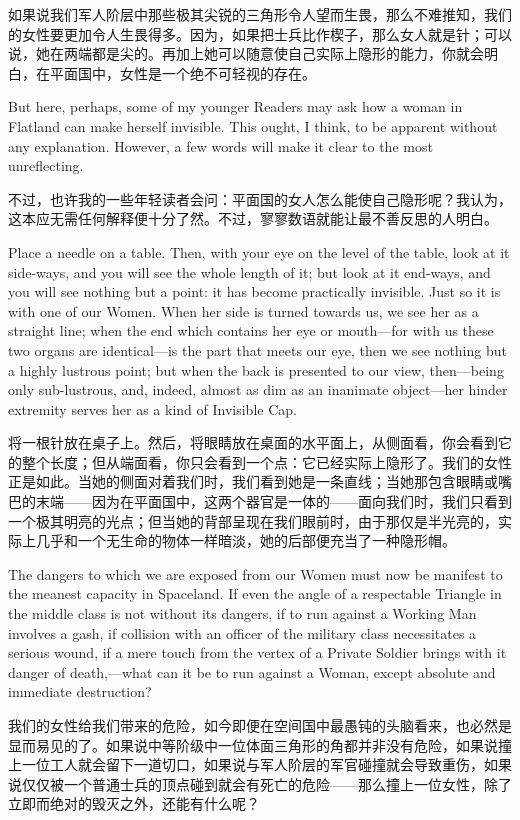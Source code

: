 \documentclass[12pt,UTF8]{ctexbook}
\begin{document}
如果说我们军人阶层中那些极其尖锐的三角形令人望而生畏，那么不难推知，我们的女性要更加令人生畏得多。因为，如果把士兵比作楔子，那么女人就是针；可以说，她在两端都是尖的。再加上她可以随意使自己实际上隐形的能力，你就会明白，在平面国中，女性是一个绝不可轻视的存在。

But here, perhaps, some of my younger Readers may ask how a woman in Flatland can make herself invisible. This ought, I think, to be apparent without any explanation. However, a few words will make it clear to the most unreflecting.

不过，也许我的一些年轻读者会问：平面国的女人怎么能使自己隐形呢？我认为，这本应无需任何解释便十分了然。不过，寥寥数语就能让最不善反思的人明白。

Place a needle on a table. Then, with your eye on the level of the table, look at it side-ways, and you will see the whole length of it; but look at it end-ways, and you will see nothing but a point: it has become practically invisible. Just so it is with one of our Women. When her side is turned towards us, we see her as a straight line; when the end which contains her eye or mouth---for with us these two organs are identical---is the part that meets our eye, then we see nothing but a highly lustrous point; but when the back is presented to our view, then---being only sub-lustrous, and, indeed, almost as dim as an inanimate object---her hinder extremity serves her as a kind of Invisible Cap.

将一根针放在桌子上。然后，将眼睛放在桌面的水平面上，从侧面看，你会看到它的整个长度；但从端面看，你只会看到一个点：它已经实际上隐形了。我们的女性正是如此。当她的侧面对着我们时，我们看到她是一条直线；当她那包含眼睛或嘴巴的末端——因为在平面国中，这两个器官是一体的——面向我们时，我们只看到一个极其明亮的光点；但当她的背部呈现在我们眼前时，由于那仅是半光亮的，实际上几乎和一个无生命的物体一样暗淡，她的后部便充当了一种隐形帽。

The dangers to which we are exposed from our Women must now be manifest to the meanest capacity in Spaceland. If even the angle of a respectable Triangle in the middle class is not without its dangers, if to run against a Working Man involves a gash, if collision with an officer of the military class necessitates a serious wound, if a mere touch from the vertex of a Private Soldier brings with it danger of death,---what can it be to run against a Woman, except absolute and immediate destruction?

我们的女性给我们带来的危险，如今即便在空间国中最愚钝的头脑看来，也必然是显而易见的了。如果说中等阶级中一位体面三角形的角都并非没有危险，如果说撞上一位工人就会留下一道切口，如果说与军人阶层的军官碰撞就会导致重伤，如果说仅仅被一个普通士兵的顶点碰到就会有死亡的危险——那么撞上一位女性，除了立即而绝对的毁灭之外，还能有什么呢？
\end{document}
